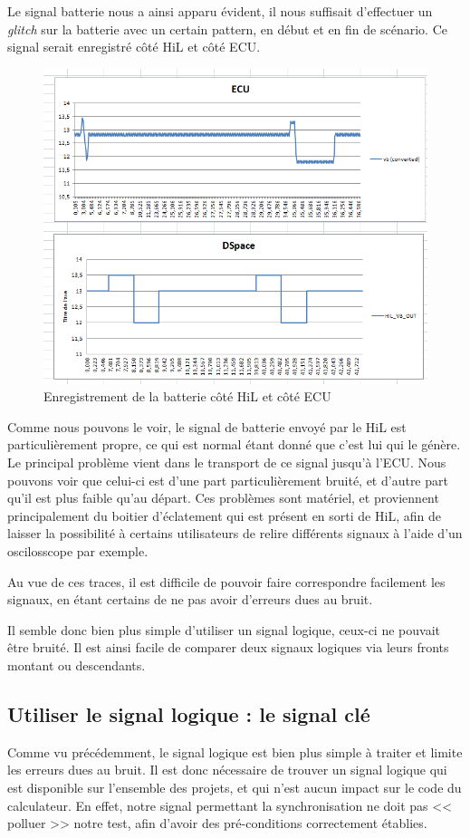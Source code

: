 Le signal batterie nous a ainsi apparu évident, il nous suffisait d'effectuer un \textit{glitch} sur la batterie avec un certain pattern, en début et en fin de scénario. Ce signal serait enregistré côté HiL et côté ECU.
\begin{figure}[h]
\centering
\vspace{-10px}
\includegraphics[width=0.61\linewidth]{contents/images/sync1}
\caption{Enregistrement de la batterie côté HiL et côté ECU}
\label{fig:sync-traces-vb}
\end{figure}

Comme nous pouvons le voir, le signal de batterie envoyé par le HiL est particulièrement propre, ce qui est normal étant donné que c'est lui qui le génère. Le principal problème vient dans le transport de ce signal jusqu'à l'ECU. Nous pouvons voir que celui-ci est d'une part particulièrement bruité, et d'autre part qu'il est plus faible qu'au départ. Ces problèmes sont matériel, et proviennent principalement du boitier d'éclatement qui est présent en sorti de HiL, afin de laisser la possibilité à certains utilisateurs de relire différents signaux à l'aide d'un oscilosscope par exemple. 

Au vue de ces traces, il est difficile de pouvoir faire correspondre facilement les signaux, en étant certains de ne pas avoir d'erreurs dues au bruit. 

Il semble donc bien plus simple d'utiliser un signal logique, ceux-ci ne pouvait être bruité. Il est ainsi facile de comparer deux signaux logiques via leurs fronts montant ou descendants. 


\subsection{Utiliser le signal logique : le signal clé}
Comme vu précédemment, le signal logique est bien plus simple à traiter et limite les erreurs dues au bruit. Il est donc nécessaire de trouver un signal logique qui est disponible sur l'ensemble des projets, et qui n'est aucun impact sur le code du calculateur. En effet, notre signal permettant la synchronisation ne doit pas << polluer >> notre test, afin d'avoir des pré-conditions correctement établies. 

